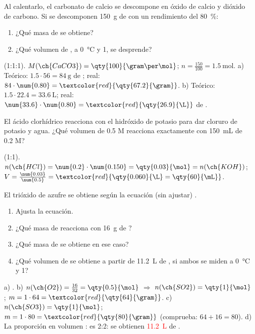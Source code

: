\begin{exercise}
    Al calentarlo, el carbonato de calcio se descompone en óxido de calcio y dióxido de carbono. Si se descomponen \qty{150}{\gram} de  con un rendimiento del \qty{80}{\percent}:
    \begin{enumerate}[label=\alph*)]
        \item ¿Qué masa de  se obtiene?
        \item ¿Qué volumen de , a \qty{0}{\celsius} y \qty{1}{\atm}, se desprende?
    \end{enumerate}
    \begin{solu}
         (1:1:1). \(M(\ch{CaCO3}) = \qty{100}{\gram\per\mol}\); \(n = \frac{150}{100} = \qty{1.5}{\mol}\).
        a) Teórico: \(\num{1.5} \cdot 56 = \qty{84}{\gram}\) de ; real: \(84 \cdot \num{0.80} = \textcolor{red}{\qty{67.2}{\gram}}\).
        b) Teórico: \(\num{1.5} \cdot \num{22.4} = \qty{33.6}{\L}\); real: \(\num{33.6} \cdot \num{0.80} = \textcolor{red}{\qty{26.9}{\L}}\) de .
    \end{solu}
\end{exercise}

\begin{exercise}
    El ácido clorhídrico reacciona con el hidróxido de potasio para dar cloruro de potasio y agua. ¿Qué volumen de  \num{0.5} M reacciona exactamente con \qty{150}{\mL} de  \num{0.2} M?
    \begin{solu}
         (1:1). \(n(\ch{HCl}) = \num{0.2} \cdot \num{0.150} = \qty{0.03}{\mol} = n(\ch{KOH})\); \(V = \frac{\num{0.03}}{\num{0.5}} = \textcolor{red}{\qty{0.060}{\L} = \qty{60}{\mL}}\).
    \end{solu}
\end{exercise}

\begin{exercise}
    El trióxido de azufre se obtiene según la ecuación (sin ajustar) .
    \begin{enumerate}[label=\alph*)]
        \item Ajusta la ecuación.
        \item ¿Qué masa de  reacciona con \qty{16}{\gram} de ?
        \item ¿Qué masa de  se obtiene en ese caso?
        \item ¿Qué volumen de  se obtiene a partir de \qty{11.2}{\L} de , si ambos se miden a \qty{0}{\celsius} y \qty{1}{\atm}?
    \end{enumerate}
    \begin{solu}
        a) .
        b) \(n(\ch{O2}) = \frac{16}{32} = \qty{0.5}{\mol}\) \(\Rightarrow\) \(n(\ch{SO2}) = \qty{1}{\mol}\); \(m = 1 \cdot 64 = \textcolor{red}{\qty{64}{\gram}}\).
        c) \(n(\ch{SO3}) = \qty{1}{\mol}\); \(m = 1 \cdot 80 = \textcolor{red}{\qty{80}{\gram}}\) (comprueba: \(64 + 16 = 80\)).
        d) La proporción en volumen : es 2:2: se obtienen \textcolor{red}{\qty{11.2}{\L}} de .
    \end{solu}
\end{exercise}

